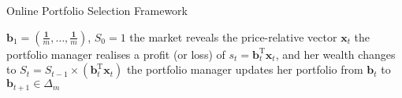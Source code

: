 \begin{algorithm}
  \caption{Online Portfolio Selection Framework}
\label{alg:olps0}
  \begin{algorithmic}[1]
     $\mathbf{b}_1 = \left(\frac{\mathbf{1}}{m}, \ldots, \frac{\mathbf{1}}{m}\right)$, $S_0 = 1$
      \STATE the market reveals the price-relative vector $\mathbf{x}_t$
      \STATE the portfolio manager realises a profit (or loss) of $s_t = \mathbf{b}_t^\text{T}\mathbf{x}_t$, and her wealth changes to $S_t = S_{t-1} \times (\mathbf{b}_t^\text{T}\mathbf{x}_t)$
      \STATE the portfolio manager updates her portfolio from $\mathbf{b}_t$ to $\mathbf{b}_{t+1} \in \Delta_m$
    \ENDIF
    \ENDFOR
  \end{algorithmic}
\end{algorithm}

